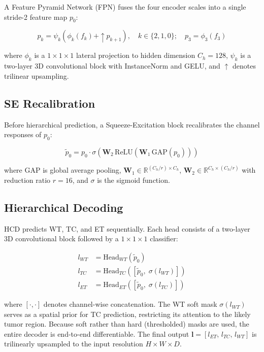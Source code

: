 \documentclass[conference]{IEEEtran}
\begin{document}
A Feature Pyramid Network (FPN) \cite{fpn} fuses the four encoder
scales into a single stride-2 feature map $p_0$:

\begin{equation}
p_k = \psi_k\!\left(\phi_k(f_k) + \uparrow\! p_{k+1}\right),
\quad k \in \{2, 1, 0\}; \quad p_3 = \phi_3(f_3)
\label{eq:fpn}
\end{equation}

where $\phi_k$ is a $1{\times}1{\times}1$ lateral projection to hidden
dimension $C_h{=}128$, $\psi_k$ is a two-layer 3D convolutional block
with InstanceNorm and GELU, and $\uparrow$ denotes trilinear upsampling.

\subsection{SE Recalibration}
Before hierarchical prediction, a Squeeze-Excitation block
\cite{se_net} recalibrates the channel responses of $p_0$:

\begin{equation}
\tilde{p}_0 = p_0 \cdot \sigma\!\left(
\mathbf{W}_2\, \text{ReLU}\!\left(\mathbf{W}_1\,
\text{GAP}(p_0)\right)\right)
\label{eq:se}
\end{equation}

where $\text{GAP}$ is global average pooling,
$\mathbf{W}_1 \in \mathbb{R}^{(C_h/r) \times C_h}$,
$\mathbf{W}_2 \in \mathbb{R}^{C_h \times (C_h/r)}$ with reduction
ratio $r{=}16$, and $\sigma$ is the sigmoid function.

\subsection{Hierarchical Decoding}
HCD predicts WT, TC, and ET sequentially. Each head consists of a
two-layer 3D convolutional block followed by a $1{\times}1{\times}1$
classifier:

\begin{align}
l_{WT} &= \text{Head}_{WT}(\tilde{p}_0)
\label{eq:wt}\\
l_{TC} &= \text{Head}_{TC}\!\left([\tilde{p}_0,\; \sigma(l_{WT})]\right)
\label{eq:tc}\\
l_{ET} &= \text{Head}_{ET}\!\left([\tilde{p}_0,\; \sigma(l_{TC})]\right)
\label{eq:et}
\end{align}

where $[\cdot, \cdot]$ denotes channel-wise concatenation. The WT soft
mask $\sigma(l_{WT})$ serves as a spatial prior for TC prediction,
restricting its attention to the likely tumor region. Because soft
rather than hard (thresholded) masks are used, the entire decoder is
end-to-end differentiable. The final output
$\mathbf{l} = [l_{ET},\, l_{TC},\, l_{WT}]$ is trilinearly upsampled
to the input resolution $H{\times}W{\times}D$.
\end{document}
